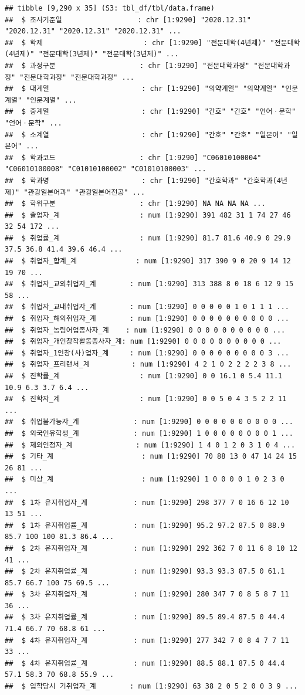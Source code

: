 \documentclass[
]{article}
\begin{document}
\begin{verbatim}
## tibble [9,290 x 35] (S3: tbl_df/tbl/data.frame)
##  $ 조사기준일                  : chr [1:9290] "2020.12.31" "2020.12.31" "2020.12.31" "2020.12.31" ...
##  $ 학제                        : chr [1:9290] "전문대학(4년제)" "전문대학(4년제)" "전문대학(3년제)" "전문대학(3년제)" ...
##  $ 과정구분                    : chr [1:9290] "전문대학과정" "전문대학과정" "전문대학과정" "전문대학과정" ...
##  $ 대계열                      : chr [1:9290] "의약계열" "의약계열" "인문계열" "인문계열" ...
##  $ 중계열                      : chr [1:9290] "간호" "간호" "언어ㆍ문학" "언어ㆍ문학" ...
##  $ 소계열                      : chr [1:9290] "간호" "간호" "일본어" "일본어" ...
##  $ 학과코드                    : chr [1:9290] "C06010100004" "C06010100008" "C01010100002" "C01010100003" ...
##  $ 학과명                      : chr [1:9290] "간호학과" "간호학과(4년제)" "관광일본어과" "관광일본어전공" ...
##  $ 학위구분                    : chr [1:9290] NA NA NA NA ...
##  $ 졸업자_계                   : num [1:9290] 391 482 31 1 74 27 46 32 54 172 ...
##  $ 취업률_계                   : num [1:9290] 81.7 81.6 40.9 0 29.9 37.5 36.8 41.4 39.6 46.4 ...
##  $ 취업자_합계_계              : num [1:9290] 317 390 9 0 20 9 14 12 19 70 ...
##  $ 취업자_교외취업자_계        : num [1:9290] 313 388 8 0 18 6 12 9 15 58 ...
##  $ 취업자_교내취업자_계        : num [1:9290] 0 0 0 0 0 1 0 1 1 1 ...
##  $ 취업자_해외취업자_계        : num [1:9290] 0 0 0 0 0 0 0 0 0 0 ...
##  $ 취업자_농림어업종사자_계    : num [1:9290] 0 0 0 0 0 0 0 0 0 0 ...
##  $ 취업자_개인창작활동종사자_계: num [1:9290] 0 0 0 0 0 0 0 0 0 0 ...
##  $ 취업자_1인창(사)업자_계     : num [1:9290] 0 0 0 0 0 0 0 0 0 3 ...
##  $ 취업자_프리랜서_계          : num [1:9290] 4 2 1 0 2 2 2 2 3 8 ...
##  $ 진학률_계                   : num [1:9290] 0 0 16.1 0 5.4 11.1 10.9 6.3 3.7 6.4 ...
##  $ 진학자_계                   : num [1:9290] 0 0 5 0 4 3 5 2 2 11 ...
##  $ 취업불가능자_계             : num [1:9290] 0 0 0 0 0 0 0 0 0 0 ...
##  $ 외국인유학생_계             : num [1:9290] 1 0 0 0 0 0 0 0 0 1 ...
##  $ 제외인정자_계               : num [1:9290] 1 4 0 1 2 0 3 1 0 4 ...
##  $ 기타_계                     : num [1:9290] 70 88 13 0 47 14 24 15 26 81 ...
##  $ 미상_계                     : num [1:9290] 1 0 0 0 0 1 0 2 3 0 ...
##  $ 1차 유지취업자_계           : num [1:9290] 298 377 7 0 16 6 12 10 13 51 ...
##  $ 1차 유지취업률_계           : num [1:9290] 95.2 97.2 87.5 0 88.9 85.7 100 100 81.3 86.4 ...
##  $ 2차 유지취업자_계           : num [1:9290] 292 362 7 0 11 6 8 10 12 41 ...
##  $ 2차 유지취업률_계           : num [1:9290] 93.3 93.3 87.5 0 61.1 85.7 66.7 100 75 69.5 ...
##  $ 3차 유지취업자_계           : num [1:9290] 280 347 7 0 8 5 8 7 11 36 ...
##  $ 3차 유지취업률_계           : num [1:9290] 89.5 89.4 87.5 0 44.4 71.4 66.7 70 68.8 61 ...
##  $ 4차 유지취업자_계           : num [1:9290] 277 342 7 0 8 4 7 7 11 33 ...
##  $ 4차 유지취업률_계           : num [1:9290] 88.5 88.1 87.5 0 44.4 57.1 58.3 70 68.8 55.9 ...
##  $ 입학당시 기취업자_계        : num [1:9290] 63 38 2 0 5 2 0 0 3 9 ...
\end{verbatim}
\end{document}
